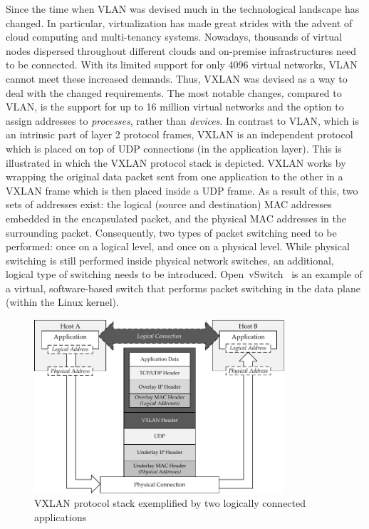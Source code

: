 Since the time when VLAN was devised much in the technological landscape has changed. In particular, virtualization has made great strides with the advent of cloud computing and multi-tenancy systems. Nowadays, thousands of virtual nodes dispersed throughout different clouds and on-premise infrastructures need to be connected. With its limited support for only 4096 virtual networks, VLAN cannot meet these increased demands. Thus, VXLAN was devised as a way to deal with the changed requirements.
The most notable changes, compared to VLAN, is the support for up to 16 million virtual networks and the option to assign addresses to \emph{processes}, rather than \emph{devices}.
In contrast to VLAN, which is an intrinsic part of layer 2 protocol frames, VXLAN is an independent protocol which is placed on top of UDP connections (in the application layer). This is illustrated  in which the VXLAN protocol stack is depicted. VXLAN works by wrapping the original data packet sent from one application to the other in a VXLAN frame which is then placed inside a UDP frame. As a result of this, two sets of addresses exist: the logical (source and destination) MAC addresses embedded in the encapsulated packet, and the physical MAC addresses in the surrounding packet.
Consequently, two types of packet switching need to be performed: once on a logical level, and once on a physical level. While physical switching is still performed inside physical network switches, an additional, logical type of switching needs to be introduced. Open~vSwitch~\cite{pfaff2015design} is an example of a virtual, software-based switch that performs packet switching in the data plane (within the Linux kernel).
\begin{figure}[htpb]
  \centering
  \includegraphics[width=0.83\textwidth]{figures/vxlan.pdf}
  \caption[VXLAN protocol stack]{VXLAN protocol stack exemplified by two logically connected applications}\label{fig:vxlan}
\end{figure}
